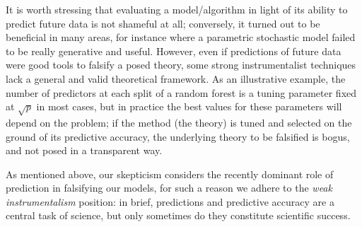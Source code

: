\documentclass{statsoc}
\begin{document}
It is worth stressing that evaluating a model/algorithm in light of its ability to predict future data is not shameful at all; conversely, it turned out to be beneficial in many areas, for instance where a parametric 
stochastic model failed to be really generative and useful. However, even if predictions of future data were good tools to falsify a posed theory,  some strong instrumentalist 
techniques lack a general and valid theoretical framework. As an illustrative example, the number of predictors at each split of a random forest is a tuning parameter fixed at $\sqrt{p}$ in most cases, but 
in practice the best values for these parameters will depend on the problem;  if the method (the theory) is tuned 
and selected on the ground of its predictive accuracy, the underlying theory to be falsified is bogus, and not posed in a transparent way. 

As mentioned above, our skepticism considers the recently dominant role of prediction in falsifying our models, for such a reason we adhere to the \emph{weak instrumentalism} position: in brief, predictions and predictive accuracy are a central task of science, but only sometimes do they constitute scientific success. 
\end{document}
